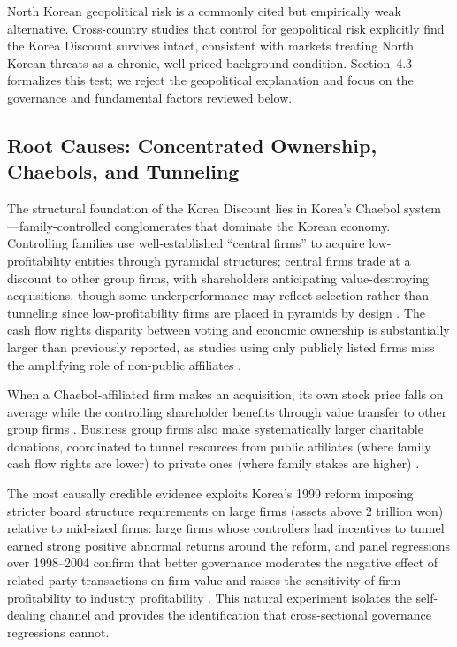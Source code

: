 North Korean geopolitical risk is a commonly cited but empirically weak alternative. Cross-country studies that control for geopolitical risk explicitly find the Korea Discount survives intact, consistent with markets treating North Korean threats as a chronic, well-priced background condition. Section~4.3 formalizes this test; we reject the geopolitical explanation and focus on the governance and fundamental factors reviewed below.

\subsection{Root Causes: Concentrated Ownership, Chaebols, and Tunneling}
The structural foundation of the Korea Discount lies in Korea's Chaebol system---family-controlled conglomerates that dominate the Korean economy. Controlling families use well-established ``central firms'' to acquire low-profitability entities through pyramidal structures; central firms trade at a discount to other group firms, with shareholders anticipating value-destroying acquisitions, though some underperformance may reflect selection rather than tunneling since low-profitability firms are placed in pyramids by design \citep{almeida_chaebol_formation}. The cash flow rights disparity between voting and economic ownership is substantially larger than previously reported, as studies using only publicly listed firms miss the amplifying role of non-public affiliates \citep{kim_chaebol_cf_rights}.

When a Chaebol-affiliated firm makes an acquisition, its own stock price falls on average while the controlling shareholder benefits through value transfer to other group firms \citep{bae_tunneling_value_added}. Business group firms also make systematically larger charitable donations, coordinated to tunnel resources from public affiliates (where family cash flow rights are lower) to private ones (where family stakes are higher) \citep{bae_business_groups_tunneling}.

The most causally credible evidence exploits Korea's 1999 reform imposing stricter board structure requirements on large firms (assets above 2 trillion won) relative to mid-sized firms: large firms whose controllers had incentives to tunnel earned strong positive abnormal returns around the reform, and panel regressions over 1998--2004 confirm that better governance moderates the negative effect of related-party transactions on firm value and raises the sensitivity of firm profitability to industry profitability \citep{black_governance_firm_value}. This natural experiment isolates the self-dealing channel and provides the identification that cross-sectional governance regressions cannot.

